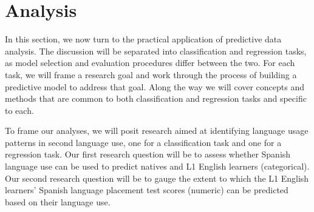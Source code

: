 \documentclass[
  letterpaper,
  krantz1]{latex/krantz-mod}
\theoremstyle{definition}
\theoremstyle{definition}
\theoremstyle{remark}
\begin{document}
\section{Analysis}\label{sec-predict-analysis}

In this section, we now turn to the practical application of predictive
data analysis. The discussion will be separated into classification and
regression tasks, as model selection and evaluation procedures differ
between the two. For each task, we will frame a research goal and work
through the process of building a predictive model to address that goal.
Along the way we will cover concepts and methods that are common to both
classification and regression tasks and specific to each.

To frame our analyses, we will posit research aimed at identifying
language usage patterns in second language use, one for a classification
task and one for a regression task. Our first research question will be
to assess whether Spanish language use can be used to predict natives
and L1 English learners (categorical). Our second research question will
be to gauge the extent to which the L1 English learners' Spanish
language placement test scores (numeric) can be predicted based on their
language use.
\end{document}
